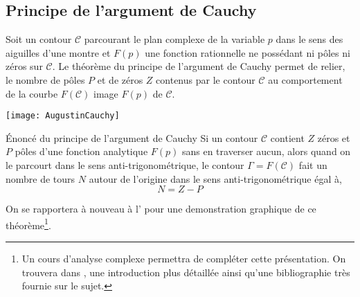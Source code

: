 \subsection{Principe de l'argument de Cauchy}
Soit un contour $\mathcal{C}$ parcourant le plan complexe de 
la variable $p$ dans le sens des aiguilles d'une montre et $F(p)$ une fonction 
rationnelle ne possédant ni pôles ni zéros sur $\mathcal{C}$. Le théorème du 
principe de l'argument de Cauchy permet de relier, le nombre de pôles $P$ et 
de zéros $Z$ contenus par le contour $\mathcal{C}$ au comportement de la 
courbe $F(\mathcal{C})$ image $F(p)$ de $\mathcal{C}$.
\begin{marginfigure}
    \centering
    \texttt{[image: AugustinCauchy]} 
    \caption*{\textbf{Augustin Louis Cauchy} 
              (1789-1857), mathématicien français (X1807)}
\end{marginfigure}
\begin{btheorem}{\'Enoncé du principe de l'argument de Cauchy
    } 
    Si un contour $\mathcal{C}$ contient $Z$ zéros et $P$ pôles d'une fonction 
    analytique $F(p)$ sans en traverser aucun, alors quand on le parcourt dans 
    le sens anti-trigonométrique, le contour $\Gamma=F(\mathcal{C})$ fait un 
    nombre de tours $N$ autour de l'origine dans le sens anti-trigonométrique 
    égal à,
    \[ 
        N=Z-P
    \]
\end{btheorem}
On se rapportera à nouveau à l' pour une demonstration 
graphique de ce théorème\footnote{Un cours d'analyse complexe permettra de 
compléter cette présentation. On trouvera dans \cite{laas_pc7bis,reg}, 
une introduction plus détaillée ainsi qu'une bibliographie très fournie 
sur le sujet.}.

